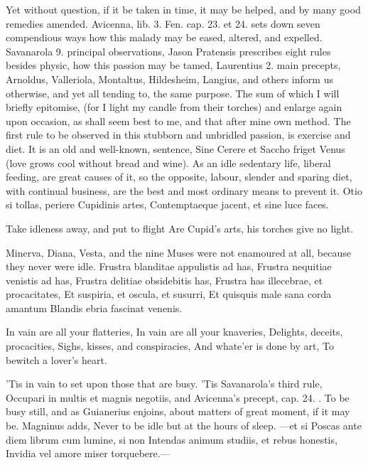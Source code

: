 {Yet without question, if it be taken in time, it may be helped, and by
many good remedies amended. Avicenna, lib. 3. Fen. cap. 23. et 24. sets
down seven compendious ways how this malady may be eased, altered, and
expelled. Savanarola 9. principal observations, Jason Pratensis
prescribes eight rules besides physic, how this passion may be tamed,
Laurentius 2. main precepts, Arnoldus, Valleriola, Montaltus,
Hildesheim, Langius, and others inform us otherwise, and yet all
tending to, the same purpose. The sum of which I will briefly
epitomise, (for I light my candle from their torches) and enlarge again
upon occasion, as shall seem best to me, and that after mine own
method. The first rule to be observed in this stubborn and unbridled
passion, is exercise and diet. It is an old and well-known, sentence,
Sine Cerere et Saccho friget Venus (love grows cool without bread and
wine). As an idle sedentary life, liberal feeding, are great
causes of it, so the opposite, labour, slender and sparing diet, with
continual business, are the best and most ordinary means to prevent it.
Otio si tollas, periere Cupidinis artes,
Contemptaeque jacent, et sine luce faces.

Take idleness away, and put to flight
Are Cupid's arts, his torches give no light.

Minerva, Diana, Vesta, and the nine Muses were not enamoured at all,
because they never were idle.
Frustra blanditae appulistis ad has,
Frustra nequitiae venistis ad has,
Frustra delitiae obsidebitis has,
Frustra has illecebrae, et procacitates,
Et suspiria, et oscula, et susurri,
Et quisquis male sana corda amantum
Blandis ebria fascinat venenis.

In vain are all your flatteries,
In vain are all your knaveries,
Delights, deceits, procacities,
Sighs, kisses, and conspiracies,
And whate'er is done by art,
To bewitch a lover's heart.

'Tis in vain to set upon those that are busy. 'Tis Savanarola's third
rule, Occupari in multis et magnis negotiis, and Avicenna's precept,
cap. 24. . To be busy still,
and as Guianerius enjoins, about matters of great moment, if it
may be. Magninus adds, Never to be idle but at the hours of
sleep.
---et si
Poscas ante diem librum cum lumine, si non
Intendas animum studiis, et rebus honestis,
Invidia vel amore miser torquebere.---

}
